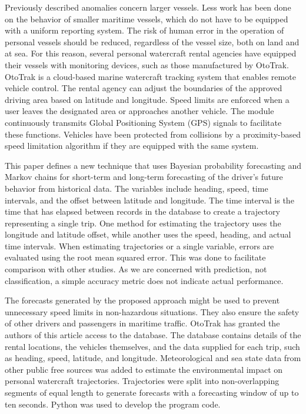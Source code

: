 \documentclass[preprint,12pt]{elsarticle}
\begin{document}
Previously described anomalies \citep{2014Mascaro, 2008Laxhammar} concern larger vessels. Less work has been done on the behavior of smaller maritime vessels, which do not have to be equipped with a uniform reporting system. The risk of human error in the operation of personal vessels should be reduced, regardless of the vessel size, both on land and at sea. For this reason, several personal watercraft rental agencies have equipped their vessels with monitoring devices, such as those manufactured by OtoTrak. OtoTrak is a cloud-based marine watercraft tracking system that enables remote vehicle control. The rental agency can adjust the boundaries of the approved driving area based on latitude and longitude. Speed limits are enforced when a user leaves the designated area or approaches another vehicle. The module continuously transmits Global Positioning System (GPS) signals to facilitate these functions. Vehicles have been protected from collisions by a proximity-based speed limitation algorithm if they are equipped with the same system.

This paper defines a new technique that uses Bayesian probability forecasting and Markov chains for short-term and long-term forecasting of the driver's future behavior from historical data. The variables include heading, speed, time intervals, and the offset between latitude and longitude. The time interval is the time that has elapsed between records in the database to create a trajectory representing a single trip. One method for estimating the trajectory uses the longitude and latitude offset, while another uses the speed, heading, and actual time intervals. When estimating trajectories or a single variable, errors are evaluated using the root mean squared error. This was done to facilitate comparison with other studies. As we are concerned with prediction, not classification, a simple accuracy metric does not indicate actual performance.

The forecasts generated by the proposed approach might be used to prevent unnecessary speed limits in non-hazardous situations. They also ensure the safety of other drivers and passengers in maritime traffic. OtoTrak has granted the authors of this article access to the database. The database contains details of the rental locations, the vehicles themselves, and the data supplied for each trip, such as heading, speed, latitude, and longitude. Meteorological and sea state data from other public free sources was added to estimate the environmental impact on personal watercraft trajectories. Trajectories were split into non-overlapping segments of equal length to generate forecasts with a forecasting window of up to ten seconds. Python was used to develop the program code.
\end{document}

